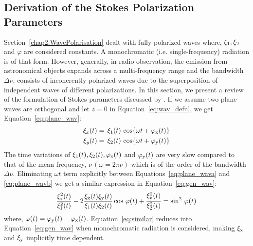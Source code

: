 \subsection{Derivation of the Stokes Polarization Parameters}	   \label{chap2:sec3.1}
%
Section~\ref{chap2:WavePolarisation} dealt with fully polarized waves where, $\xi_{\rm 1},\xi_{\rm 2}$ and $\varphi$ are considered constants. 
A monochromatic (i.e. single-frequency) radiation is of that form. However, generally, in radio observation, the emission from astronomical objects expands
across a multi-frequency range and the bandwidth $\Delta \nu$, consists of incoherently polarized waves due to the superposition of independent waves of different polarizations.
In this section, we present a review of the formulation of Stokes parameters discussed by \cite{Kraus1966}. If we assume two plane waves are orthogonal and let $z = 0$ in Equation~\ref{eq:wav_defn}, 
we get  Equation~\ref{eq:plane_wav}:
\begin{subequations}
\begin{align}
\xi_{x}(t) & =\, \xi_{\rm 1}(t)\, \cos\{\omega t  + \varphi_{\rm x} (t) \} \label{eq:plane_wava} \\
\xi_{y}(t)  & =\, \xi_{\rm 2}(t)\, \cos\{\omega t + \varphi_{\rm y}(t) \} \label{eq:plane_wavb}
  \end{align}
  \label{eq:plane_wav}
\end{subequations}
%
The time variations of $\xi_{\rm 1}(t),  \xi_{\rm 2}(t), \varphi_{\rm x} (t)$ and $\varphi_{\rm y} (t)$ are very slow compared to that of the mean frequency, 
$\nu \,(\omega = 2\pi \nu)$ which is of the order of the bandwidth $\Delta \nu$. Eliminating $\omega t $ term explicitly between Equations~\ref{eq:plane_wava} and \ref{eq:plane_wavb}
we get a similar expression in Equation~\ref{eq:gen_wav}:
%
\begin{equation}
  \begin{aligned}
   \frac{\xi_{\rm x}^2(t)}{\xi_{\rm 1}^{2}(t)} - 2 \frac{\xi_{\rm x}(t)\xi_{\rm y}(t)}{\xi_{1}(t)\xi_{2}(t)}\cos\, \varphi(t)  + \frac{\xi_{\rm y}^2(t)}{\xi_{2}^{2}(t)}  = \sin^{2}\, \varphi (t)
  \end{aligned}
  \label{eq:similar}
 \end{equation} 
%
where, $\varphi(t) = \varphi_{\rm y}(t) - \varphi_{\rm x}(t)$. Equation~\ref{eq:similar} reduces into Equation~\ref{eq:gen_wav} when monochromatic radiation is considered,
making $\xi_{\rm x}$ and $\xi_{\rm y}$ implicitly time dependent.

